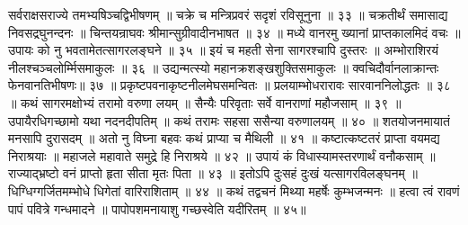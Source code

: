 सर्वराक्षसराज्ये तमभ्यषिञ्चद्विभीषणम् ॥
चक्रे च मन्त्रिप्रवरं सदृशं रविसूनुना ॥ ३३ ॥
चक्रतीर्थं समासाद्य निवसद्रघुनन्दनः ॥
चिन्तयन्राघवः श्रीमान्सुग्रीवादीनभाषत ॥ ३४ ॥
मध्ये वानरमु ख्यानां प्राप्तकालमिदं वचः ॥
उपायः को नु भवतामेतत्सागरलङ्घने ॥ ३५ ॥
इयं च महती सेना सागरश्चापि दुस्तरः ॥
अम्भोराशिरयं नीलश्चञ्चलोर्म्मिसमाकुलः ॥ ३६ ॥
उद्यन्मत्स्यो महानक्रशङ्खशुक्तिसमाकुलः ॥
क्वचिदौर्वानलाक्रान्तः फेनवानतिभीषणः॥ ३७ ॥
प्रकृष्टपवनाकृष्टनीलमेघसमन्वितः ॥
प्रलयाम्भोधरारावः सारवाननिलोद्धतः ॥ ३८ ॥
कथं सागरमक्षोभ्यं तरामो वरुणा लयम् ॥
सैन्यैः परिवृताः सर्वे वानराणां महौजसाम् ॥ ३९ ॥
उपायैरधिगच्छामो यथा नदनदीपतिम् ॥
कथं तरामः सहसा ससैन्या वरुणालयम् ॥ ४० ॥
शतयोजनमायातं मनसापि दुरासदम् ॥
अतो नु विघ्ना बहवः कथं प्राप्या च मैथिली ॥ ४१ ॥
कष्टात्कष्टतरं प्राप्ता वयमद्य निराश्रयाः ॥
महाजले महावाते समुद्रे हि निराश्रये ॥ ४२ ॥
उपायं कं विधास्यामस्तरणार्थं वनौकसाम् ॥
राज्याद्भ्रष्टो वनं प्राप्तो हृता सीता मृतः पिता ॥ ४३ ॥
इतोऽपि दुःसहं दुःखं यत्सागरविलङ्घनम् ॥
धिग्धिग्गर्जितमम्भोधे धिगेतां वारिराशिताम् ॥ ४४ ॥
कथं तद्वचनं मिथ्या महर्षेः कुम्भजन्मनः ॥
हत्वा त्वं रावणं पापं पवित्रे गन्धमादने ॥
पापोपशमनायाशु गच्छस्वेति यदीरितम् ॥ ४५॥

